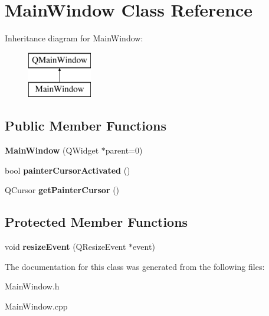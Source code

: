 \hypertarget{class_main_window}{}\section{Main\+Window Class Reference}
\label{class_main_window}
Inheritance diagram for Main\+Window\+:\begin{figure}[H]
\begin{center}
\leavevmode
\includegraphics[height=2.000000cm]{class_main_window}
\end{center}
\end{figure}
\subsection*{Public Member Functions}
\begin{DoxyCompactItemize}
\item 
\hypertarget{class_main_window_a8b244be8b7b7db1b08de2a2acb9409db}{}{\bfseries Main\+Window} (Q\+Widget $\ast$parent=0)\label{class_main_window_a8b244be8b7b7db1b08de2a2acb9409db}

\item 
\hypertarget{class_main_window_a0f6f0466e2aca15edd6c820a686c6b57}{}bool {\bfseries painter\+Cursor\+Activated} ()\label{class_main_window_a0f6f0466e2aca15edd6c820a686c6b57}

\item 
\hypertarget{class_main_window_aa0e9c2933778a0a94a2d2010b28ee0f2}{}Q\+Cursor {\bfseries get\+Painter\+Cursor} ()\label{class_main_window_aa0e9c2933778a0a94a2d2010b28ee0f2}

\end{DoxyCompactItemize}
\subsection*{Protected Member Functions}
\begin{DoxyCompactItemize}
\item 
\hypertarget{class_main_window_ae12f8f63791595567b6250f8bb002bda}{}void {\bfseries resize\+Event} (Q\+Resize\+Event $\ast$event)\label{class_main_window_ae12f8f63791595567b6250f8bb002bda}

\end{DoxyCompactItemize}


The documentation for this class was generated from the following files\+:\begin{DoxyCompactItemize}
\item 
Main\+Window.\+h\item 
Main\+Window.\+cpp\end{DoxyCompactItemize}
